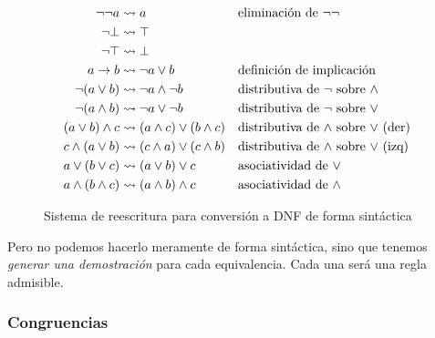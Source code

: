 \begin{figure}[H]
    \begin{align*}
        \neg\neg a &\rightsquigarrow
            a
            &&\text{eliminación de $\neg\neg$}\\
        \neg \bot &\rightsquigarrow
            \top\\
        \neg \top &\rightsquigarrow
            \bot\\
        a \to b &\rightsquigarrow
            \neg a \vee b
            &&\text{definición de implicación}\\
        \neg(a \vee b) &\rightsquigarrow
            \neg a \wedge \neg b
            &&\text{distributiva de $\neg$ sobre $\wedge$}\\
        \neg(a \wedge b) &\rightsquigarrow
            \neg a \vee \neg b
            &&\text{distributiva de $\neg$ sobre $\vee$}\\
        (a \vee b) \wedge c &\rightsquigarrow
            (a \wedge c) \vee (b \wedge c)
            &&\text{distributiva de $\wedge$ sobre $\vee$ (der)}\\
        c \wedge (a \vee b) &\rightsquigarrow
            (c \wedge a) \vee (c \wedge b)
            &&\text{distributiva de $\wedge$ sobre $\vee$ (izq)}\\
        a \vee (b \vee c) &\rightsquigarrow
            (a \vee b) \vee c
            &&\text{asociatividad de $\vee$}\\
        a \wedge (b \wedge c) &\rightsquigarrow
            (a \wedge b) \wedge c
            &&\text{asociatividad de $\wedge$}
    \end{align*}    
    \caption{Sistema de reescritura para conversión a DNF de forma sintáctica}
\end{figure}

Pero no podemos hacerlo meramente de forma sintáctica, sino que tenemos
\textit{generar una demostración} para cada equivalencia. Cada una será una regla admisible.

\subsubsection{Congruencias}

